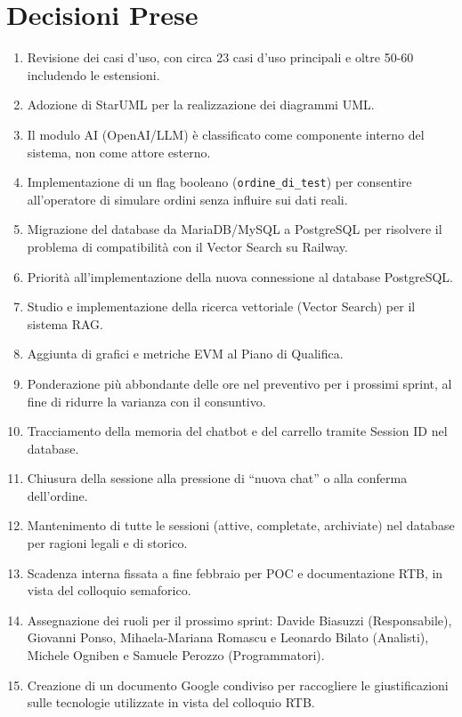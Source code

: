 \documentclass[a4paper, 11pt, oneside]{scrartcl}
\begin{document}
\newpage
\section{Decisioni Prese}
\begin{enumerate}
    \item Revisione dei casi d'uso, con circa 23 casi d'uso principali e oltre 50-60 includendo le estensioni.
    \item Adozione di StarUML per la realizzazione dei diagrammi UML.
    \item Il modulo AI (OpenAI/LLM) è classificato come componente interno del sistema, non come attore esterno.
    \item Implementazione di un flag booleano (\texttt{ordine\_di\_test}) per consentire all'operatore di simulare ordini senza influire sui dati reali.
    \item Migrazione del database da MariaDB/MySQL a PostgreSQL per risolvere il problema di compatibilità con il Vector Search su Railway.
    \item Priorità all'implementazione della nuova connessione al database PostgreSQL.
    \item Studio e implementazione della ricerca vettoriale (Vector Search) per il sistema RAG.
    \item Aggiunta di grafici e metriche EVM al Piano di Qualifica.
    \item Ponderazione più abbondante delle ore nel preventivo per i prossimi sprint, al fine di ridurre la varianza con il consuntivo.
    \item Tracciamento della memoria del chatbot e del carrello tramite Session ID nel database.
    \item Chiusura della sessione alla pressione di ``nuova chat'' o alla conferma dell'ordine.
    \item Mantenimento di tutte le sessioni (attive, completate, archiviate) nel database per ragioni legali e di storico.
    \item Scadenza interna fissata a fine febbraio per POC e documentazione RTB, in vista del colloquio semaforico.
    \item Assegnazione dei ruoli per il prossimo sprint: Davide Biasuzzi (Responsabile), Giovanni Ponso, Mihaela-Mariana Romascu e Leonardo Bilato (Analisti), Michele Ogniben e Samuele Perozzo (Programmatori).
    \item Creazione di un documento Google condiviso per raccogliere le giustificazioni sulle tecnologie utilizzate in vista del colloquio RTB.
\end{enumerate}
\end{document}
